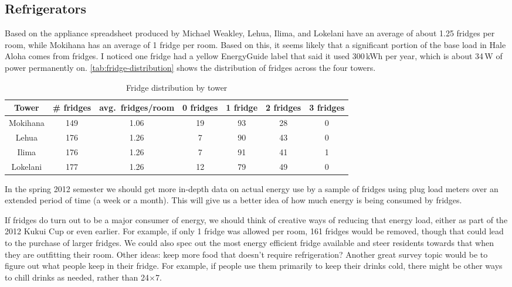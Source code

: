 \documentclass[11pt,final]{article}
\newcommand{\W}{\,W\xspace}
\newcommand{\kWh}{\,kWh\xspace}
\begin{document}
\subsection{Refrigerators}

Based on the appliance spreadsheet produced by Michael Weakley, Lehua, Ilima, and Lokelani have an average of about 1.25 fridges per room, while Mokihana has an average of 1 fridge per room. Based on this, it seems likely that a significant portion of the base load in Hale Aloha comes from fridges. I noticed one fridge had a yellow EnergyGuide label that said it used 300\kWh per year, which is about 34\W of power permanently on. \autoref{tab:fridge-distribution} shows the distribution of fridges across the four towers.

\begin{table}[htbp]
	\centering
		\begin{tabular}{| c || c | c | c | c | c | c |}
			\hline
			Tower & \# fridges & avg.\ fridges/room & 0 fridges & 1 fridge & 2 fridges & 3 fridges \tabularnewline \hline \hline
			
			Mokihana & 149 & 1.06 & 19 & 93 & 28 & 0  \tabularnewline \hline
			
			Lehua & 176 & 1.26 & 7 & 90 & 43 & 0 \tabularnewline \hline
			
			Ilima & 176 & 1.26 & 7 & 91 & 41 & 1 \tabularnewline \hline

			Lokelani & 177 & 1.26 & 12 & 79 & 49 & 0 \tabularnewline \hline

		\end{tabular}
	\caption{Fridge distribution by tower}
\label{tab:fridge-distribution}
\end{table}

In the spring 2012 semester we should get more in-depth data on actual energy use by a sample of fridges using plug load meters over an extended period of time (a week or a month). This will give us a better idea of how much energy is being consumed by fridges.

If fridges do turn out to be a major consumer of energy, we should think of creative ways of reducing that energy load, either as part of the 2012 Kukui Cup or even earlier. For example, if only 1 fridge was allowed per room, 161 fridges would be removed, though that could lead to the purchase of larger fridges. We could also spec out the most energy efficient fridge available and steer residents towards that when they are outfitting their room. Other ideas: keep more food that doesn't require refrigeration? Another great survey topic would be to figure out what people keep in their fridge. For example, if people use them primarily to keep their drinks cold, there might be other ways to chill drinks as needed, rather than 24$\times$7.
\end{document}
